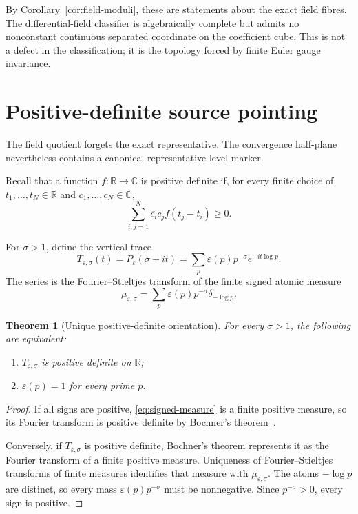 \documentclass[11pt]{article}
\newtheorem{theorem}{Theorem}[section]
\theoremstyle{definition}
\theoremstyle{remark}
\newcommand{\C}{\mathbb C}
\newcommand{\R}{\mathbb R}
\begin{document}
By Corollary~\ref{cor:field-moduli}, these are statements about the exact field fibres.  The
differential-field classifier is algebraically complete but admits no nonconstant continuous
separated coordinate on the coefficient cube.  This is not a defect in the classification; it is
the topology forced by finite Euler gauge invariance.

\section{Positive-definite source pointing}\label{sec:pointing}

The field quotient forgets the exact representative.  The convergence half-plane nevertheless
contains a canonical representative-level marker.

Recall that a function \(f:\R\to\C\) is positive definite if, for every finite choice of
\(t_1,\ldots,t_N\in\R\) and \(c_1,\ldots,c_N\in\C\),
\[
  \sum_{i,j=1}^N\overline{c_i}c_j f(t_j-t_i)\geq0.
\]

For \(\sigma>1\), define the vertical trace
\begin{equation}\label{eq:vertical-trace}
  T_{\varepsilon,\sigma}(t)
  =P_\varepsilon(\sigma+it)
  =\sum_p\varepsilon(p)p^{-\sigma}e^{-it\log p}.
\end{equation}
The series is the Fourier--Stieltjes transform of the finite signed atomic measure
\begin{equation}\label{eq:signed-measure}
  \mu_{\varepsilon,\sigma}
  =\sum_p\varepsilon(p)p^{-\sigma}\delta_{-\log p}.
\end{equation}

\begin{theorem}[Unique positive-definite orientation]\label{thm:positive-pointing}
For every \(\sigma>1\), the following are equivalent:
\begin{enumerate}[label=\textup{(\roman*)},leftmargin=2.2em]
  \item \(T_{\varepsilon,\sigma}\) is positive definite on \(\R\);
  \item \(\varepsilon(p)=1\) for every prime \(p\).
\end{enumerate}
\end{theorem}

\begin{proof}
If all signs are positive, \eqref{eq:signed-measure} is a finite positive measure, so its Fourier
transform is positive definite by Bochner's theorem~\cite{Bochner1933,RudinFourier}.

Conversely, if \(T_{\varepsilon,\sigma}\) is positive definite, Bochner's theorem represents it
as the Fourier transform of a finite positive measure.  Uniqueness of Fourier--Stieltjes transforms
of finite measures identifies that measure with \(\mu_{\varepsilon,\sigma}\).  The atoms
\(-\log p\) are distinct, so every mass \(\varepsilon(p)p^{-\sigma}\) must be nonnegative.
Since \(p^{-\sigma}>0\), every sign is positive.
\end{proof}
\end{document}
